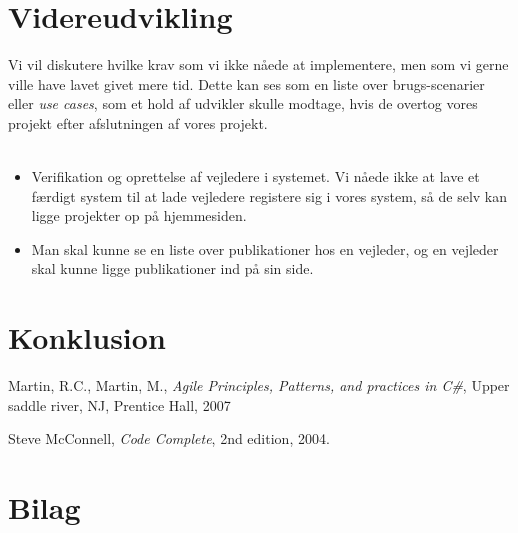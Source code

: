 \documentclass[12pt]{article}
\begin{document}
\section{Videreudvikling}
\label{sec:udvikling}
Vi vil diskutere hvilke krav som vi ikke nåede at implementere, men som vi gerne ville have lavet givet mere tid. Dette kan ses som en liste over brugs-scenarier eller \textit{use cases}, som et hold af udvikler skulle modtage, hvis de overtog vores projekt efter afslutningen af vores projekt. \\ \\
\begin{itemize}
\item Verifikation og oprettelse af vejledere i systemet. Vi nåede ikke at lave et færdigt system til at lade vejledere registere sig i vores system, så de selv kan ligge projekter op på hjemmesiden.
\item Man skal kunne se en liste over publikationer hos en vejleder, og en vejleder skal kunne ligge publikationer ind på sin side.
\end{itemize}

\section{Konklusion}
\label{sec:konklusion}

\begin{thebibliography}{9}

	Martin, R.C., Martin, M.,
	\emph{Agile Principles, Patterns, and practices in C\#},
	Upper saddle river, NJ, Prentice Hall,
	2007

	Steve McConnell,
	\emph{Code Complete},
	2nd edition,
	2004.

\end{thebibliography}


\section{Bilag}
\label{sec:bilag}
\end{document}
